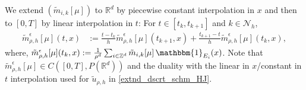 \documentclass[a4paper,  twoside, 10pt, leqno]{amsart}
\newcommand{\Z}{\mathbb{Z}}
\newcommand{\zd}{\mathbb{Z}^d}
\newcommand{\rd}{\mathbb{R}^d}
\theoremstyle{remark}
\theoremstyle{definition}
\begin{document}
We extend $(\tilde m_{i,k}[\mu])$ to $\rd$ by piecewise constant interpolation in
$x$ and then to $[0,T]$ by linear interpolation in $t$: For $t\in
[t_k,t_{k+1}]$ and $k\in \mathcal{N}_h$,
\begin{align}\label{exten_disc_measure}
\tilde m_{\rho,h}^{\epsilon}[\mu](t,x)& := \frac{t-t_k}{h}
\tilde m_{\rho,h}^{\epsilon}[\mu](t_{k+1},x)+ \frac{t_{k+1}-t}{h}
\tilde m_{\rho,h}^{\epsilon}[\mu](t_{k},x), 
\end{align}
where, 
$\tilde m_{\rho,h}^{\epsilon}[\mu](t_k,x) := \frac{1}{\rho^d} \sum_{i\in
  \zd} \tilde m_{i,k}[\mu] \, \mathbbm{1}_{E_i}(x)$. 
 Note that $\tilde m_{\rho,h}^{\epsilon}[\mu] \in C([0,T],P(\rd))$ and the
duality with the linear in $x$/constant in
$t$ interpolation  used for $\tilde{u}_{\rho,h}$ in
\eqref{extnd_dscrt_schm_HJ}.





\end{document}
